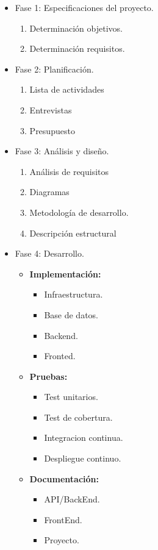 \begin{itemize}
  \item Fase 1: Especificaciones del proyecto.
    \begin{enumerate}
      \item Determinación objetivos.
      \item Determinación requisitos.
    \end{enumerate}
  \item Fase 2: Planificación.
    \begin{enumerate}
      \item Lista de actividades
      \item Entrevistas
      \item Presupuesto
    \end{enumerate}
  \item Fase 3: Análisis y diseño.
    \begin{enumerate}
      \item Análisis de requisitos
      \item Diagramas
      \item Metodología de desarrollo.
      \item Descripción estructural
    \end{enumerate}
  \item Fase 4: Desarrollo.
    \begin{itemize}
       \item \textbf{Implementación:} 
       \begin{itemize}
         \item  Infraestructura.
         \item  Base de datos.
         \item  Backend.
         \item  Fronted.
       \end{itemize}
       \item \textbf{Pruebas:} 
       \begin{itemize}
        \item  \gls{Test unitarios}.
        \item  \gls{Test de cobertura}.
        \item  \gls{Integracion continua}.
        \item  \gls{Despliegue continuo}.
       \end{itemize}
       \item \textbf{Documentación:} 
       \begin{itemize}
        \item  API/BackEnd.
        \item  FrontEnd.
        \item  Proyecto.
       \end{itemize}
    \end{itemize}
\end{itemize}

